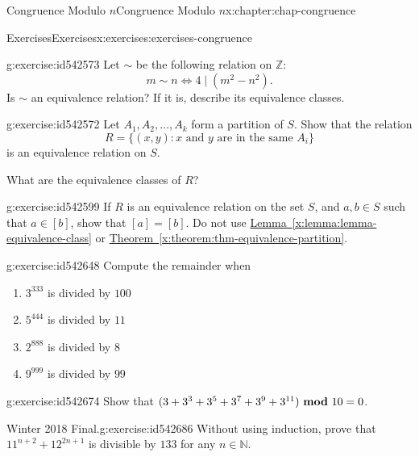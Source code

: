 \documentclass[oneside,10pt,]{book}
\newcommand{\xreffont}{\relax}
\numberwithin{equation}{section}
\newcommand{\mmod}[1]{\ \mathrm{\bf mod}\ #1}
\begin{document}
\begin{chapterptx}{Congruence Modulo \(n\)}{}{Congruence Modulo \(n\)}{}{}{x:chapter:chap-congruence}
\begin{exercises-section}{Exercises}{}{Exercises}{}{}{x:exercises:exercises-congruence}
\begin{divisionexercise}{3}{}{}{g:exercise:id542573}%
Let \(\sim\) be the following relation on \(\mathbb{Z}\):%
\begin{equation*}
m \sim n \Leftrightarrow 4 \mid (m^2 - n^2)\text{.}
\end{equation*}
Is \(\sim\) an equivalence relation? If it is, describe its equivalence classes.%
\end{divisionexercise}%
\begin{divisionexercise}{4}{}{}{g:exercise:id542572}%
Let \(A_1, A_2, \ldots, A_k\) form a partition of \(S\). Show that the relation%
\begin{equation*}
R = \{(x,y) : x \text{ and } y \text{ are in the same $A_i$}\}
\end{equation*}
is an equivalence relation on \(S\).%
\par
What are the equivalence classes of \(R\)?%
\end{divisionexercise}%
\begin{divisionexercise}{5}{}{}{g:exercise:id542599}%
If \(R\) is an equivalence relation on the set \(S\), and \(a, b \in S\) such that \(a \in [b]\), show that \([a] = [b]\). Do not use \hyperref[x:lemma:lemma-equivalence-class]{Lemma~{\xreffont\ref{x:lemma:lemma-equivalence-class}}} or \hyperref[x:theorem:thm-equivalence-partition]{Theorem~{\xreffont\ref{x:theorem:thm-equivalence-partition}}}.%
\end{divisionexercise}%
\begin{divisionexercise}{6}{}{}{g:exercise:id542648}%
Compute the remainder when%
\begin{enumerate}[label=(\alph*)]
\item{}\(3^{333}\) is divided by \(100\)%
\item{}\(5^{444}\) is divided by \(11\)%
\item{}\(2^{888}\) is divided by \(8\)%
\item{}\(9^{999}\) is divided by \(99\)%
\end{enumerate}
%
\end{divisionexercise}%
\begin{divisionexercise}{7}{}{}{g:exercise:id542674}%
Show that \((3 + 3^3 + 3^5 + 3^7 + 3^9 + 3^{11}) \mmod{10} = 0\).%
\end{divisionexercise}%
\begin{divisionexercise}{8}{Winter 2018 Final.}{}{g:exercise:id542686}%
Without using induction, prove that \(11^{n+2} + 12^{2n+1}\) is divisible by \(133\) for any \(n \in \mathbb{N}\).%

\end{divisionexercise}
\end{exercises-section}
\end{chapterptx}
\end{document}
